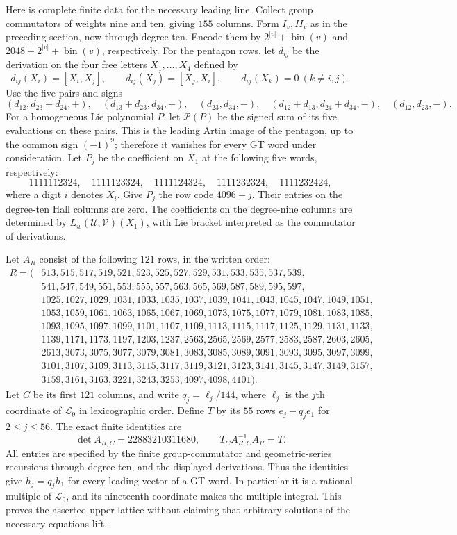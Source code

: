 Here is complete finite data for the necessary leading line.
Collect group commutators of weights nine and ten, giving $155$
columns. Form $I_v,II_v$ as in the preceding section, now through
degree ten. Encode them by $2^{|v|}+\operatorname{bin}(v)$ and
$2048+2^{|v|}+\operatorname{bin}(v)$, respectively.
For the pentagon rows, let $d_{ij}$ be the derivation on the four
free letters $X_1,\ldots,X_4$ defined by
\[
 d_{ij}(X_i)=[X_i,X_j],\qquad
 d_{ij}(X_j)=[X_j,X_i],\qquad d_{ij}(X_k)=0\ (k\ne i,j).
\]
Use the five pairs and signs
\[
 (d_{12},d_{23}+d_{24},+),\quad
 (d_{13}+d_{23},d_{34},+),\quad
 (d_{23},d_{34},-),\quad
 (d_{12}+d_{13},d_{24}+d_{34},-),\quad
 (d_{12},d_{23},-).
\]
For a homogeneous Lie polynomial $P$, let $\mathcal P(P)$ be the
signed sum of its five evaluations on these pairs. This is the
leading Artin image of the pentagon, up to the common sign $(-1)^9$;
therefore it vanishes for every GT word under consideration.
Let $P_j$ be the coefficient on $X_1$ at the following five words,
respectively:
\[
 1111112324,\quad1111123324,\quad1111124324,\quad
 1111232324,\quad1111232424,
\]
where a digit $i$ denotes $X_i$. Give $P_j$ the row code $4096+j$.
Their entries on the degree-ten Hall columns are zero. The
coefficients on the degree-nine columns are determined by
$L_w(\mathcal U,\mathcal V)(X_1)$, with Lie bracket interpreted as
the commutator of derivations.

Let $A_R$ consist of the following $121$ rows, in the written order:
\[
\begin{aligned}
R=(&513,515,517,519,521,523,525,527,529,531,533,535,537,539,\\
&541,547,549,551,553,555,557,563,565,569,587,589,595,597,\\
&1025,1027,1029,1031,1033,1035,1037,1039,1041,1043,1045,1047,1049,1051,\\
&1053,1059,1061,1063,1065,1067,1069,1073,1075,1077,1079,1081,1083,1085,\\
&1093,1095,1097,1099,1101,1107,1109,1113,1115,1117,1125,1129,1131,1133,\\
&1139,1171,1173,1197,1203,1237,2563,2565,2569,2577,2583,2587,2603,2605,\\
&2613,3073,3075,3077,3079,3081,3083,3085,3089,3091,3093,3095,3097,3099,\\
&3101,3107,3109,3113,3115,3117,3119,3121,3123,3141,3145,3147,3149,3157,\\
&3159,3161,3163,3221,3243,3253,4097,4098,4101).
\end{aligned}
\]
Let $C$ be its first $121$ columns, and write
$q_j=\ell_j/144$, where $\ell_j$ is the $j$th coordinate of
$\mathcal L_9$ in lexicographic order. Define $T$ by its $55$ rows
$e_j-q_je_1$ for $2\le j\le56$. The exact finite identities are
\[
 \det A_{R,C}=22883210311680,\qquad
 T_C A_{R,C}^{-1}A_R=T.
\]
All entries are specified by the finite group-commutator and
geometric-series recursions through degree ten, and the displayed
derivations. Thus the identities give $h_j=q_jh_1$ for every
leading vector of a GT word. In particular it is a rational multiple
of $\mathcal L_9$, and its nineteenth coordinate makes the multiple
integral. This proves the asserted upper lattice without claiming
that arbitrary solutions of the necessary equations lift.


